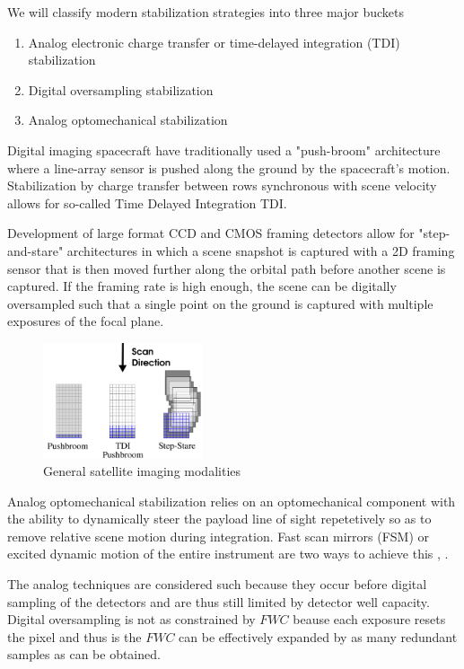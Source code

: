 \documentclass[10pt,journal]{IEEEtran}  %
\begin{document}
We will classify modern stabilization strategies into three major buckets

\begin{enumerate}
\item Analog electronic charge transfer or time-delayed integration (TDI) stabilization
\item Digital oversampling stabilization
\item Analog optomechanical stabilization
\end{enumerate}

Digital imaging spacecraft have traditionally used a "push-broom" architecture where a line-array sensor is pushed along the ground by the spacecraft's motion.  Stabilization by charge transfer between rows synchronous with scene velocity allows for so-called Time Delayed Integration TDI.  

Development of large format CCD and CMOS framing detectors allow for  "step-and-stare" architectures in which a scene snapshot is captured with a 2D framing sensor that is then moved further along the orbital path before another scene is captured.  If the framing rate is high enough, the scene can be digitally oversampled such that a single point on the ground is captured with multiple exposures of the focal plane.

\begin{figure}[h!t]
\includegraphics[width=0.42\textwidth]{figures/modalities.png}
\caption{General satellite imaging modalities}
\label{fig:modalities}
\end{figure}

Analog optomechanical stabilization relies on an optomechanical component with the ability to dynamically steer the payload line of sight repetetively so as to remove relative scene motion during integration.  Fast scan mirrors (FSM) or excited dynamic motion of the entire instrument are two ways to achieve this \cite{patent:jonny}, \cite{patent:dirk}.

The analog techniques are considered such because they occur before digital sampling of the detectors and are thus still limited by detector well capacity.  Digital oversampling is not as constrained by $FWC$ beause each exposure resets the pixel and thus is the $FWC$ can be effectively expanded by as many redundant samples as can be obtained.
\end{document}
